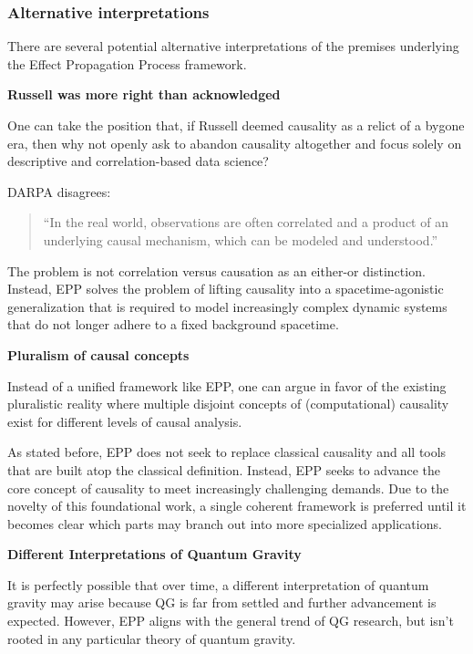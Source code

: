 \documentclass{article}
\begin{document}
\subsubsection{Alternative interpretations}

There are several potential alternative interpretations of the premises underlying the Effect Propagation Process framework.

\textbf{Russell was more right than acknowledged}

One can take the position that, if Russell deemed causality as a relict of a bygone era, then why not openly ask to abandon causality altogether and focus solely on descriptive and correlation-based data science?

DARPA disagrees\cite{DARPA_ANSR}:

\begin{quote}
    “In the real world, observations are often correlated and a product of an underlying causal mechanism, which can be modeled and understood.”
\end{quote}

The problem is not correlation versus causation as an either-or distinction. Instead, EPP solves the problem of lifting causality into a spacetime-agonistic generalization that is required to model increasingly complex dynamic systems that do not longer adhere to a fixed background spacetime.

\textbf{Pluralism of causal concepts}

Instead of a unified framework like EPP, one can argue in favor of the existing pluralistic reality where multiple disjoint concepts of (computational) causality exist for different levels of causal analysis.

As stated before, EPP does not seek to replace classical causality and all tools that are built atop the classical definition. Instead, EPP seeks to advance the core concept of causality to meet increasingly challenging demands. Due to the novelty of this foundational work, a single coherent framework is preferred until it becomes clear which parts may branch out into more specialized applications.


\textbf{Different Interpretations of Quantum Gravity}

It is perfectly possible that over time, a different interpretation of quantum gravity may arise because QG is far from settled and further advancement is expected. However, EPP aligns with the general trend of QG research, but isn't rooted in any particular theory of quantum gravity.
\end{document}
